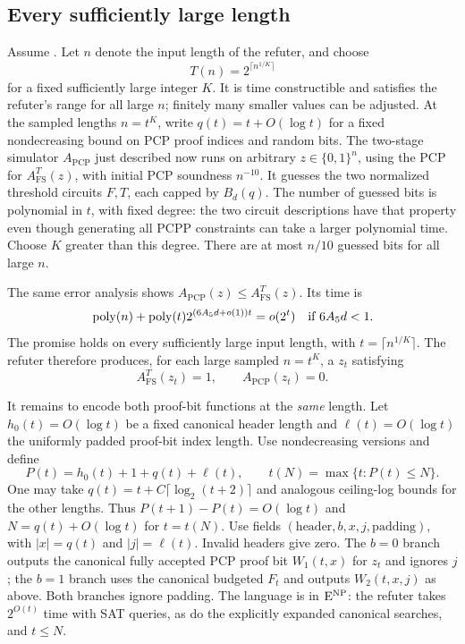 \subsection{Every sufficiently large length}
\label{subsec:ae}

Assume \HTC. Let $n$ denote the input length of the refuter, and
choose
\[
 T(n)=2^{\lceil n^{1/K}\rceil}
\]
for a fixed sufficiently large integer $K$. It is time constructible
and satisfies the refuter's range for all large $n$; finitely many
smaller values can be adjusted. At the sampled lengths $n=t^K$,
write $q(t)=t+O(\log t)$ for a fixed nondecreasing bound on PCP proof
indices and random bits. The two-stage simulator $A_{\mathrm{PCP}}$
just described now runs on arbitrary $z\in\{0,1\}^n$, using the PCP
for $A^T_{\mathrm{FS}}(z)$, with initial PCP soundness $n^{-10}$.
It guesses the two normalized threshold circuits $F,T$, each capped
by $B_d(q)$. The number of guessed bits is polynomial in $t$, with
fixed degree: the two circuit descriptions have that property even
though generating all PCPP constraints can take a larger polynomial
time. Choose $K$ greater than this degree. There are at most $n/10$
guessed bits for all large $n$.

The same error analysis shows
$A_{\mathrm{PCP}}(z)\le A^T_{\mathrm{FS}}(z)$. Its time is
\[
 \operatorname{poly}(n)+\operatorname{poly}(t)2^{(6A_5d+o(1))t}=o(2^t)
 \quad\text{if }6A_5d<1.
\]
The promise holds on every sufficiently large input length, with
$t=\lceil n^{1/K}\rceil$. The refuter therefore produces, for each
large sampled $n=t^K$, a $z_t$ satisfying
\begin{equation}\label{eq:refuter-gap}
 A^T_{\mathrm{FS}}(z_t)=1,
 \qquad A_{\mathrm{PCP}}(z_t)=0.
\end{equation}

It remains to encode both proof-bit functions at the \emph{same}
length. Let $h_0(t)=O(\log t)$ be a fixed canonical header length
and $\ell(t)=O(\log t)$ the uniformly padded proof-bit index length.
Use nondecreasing versions and define
\begin{equation}\label{eq:ae-padding}
 P(t)=h_0(t)+1+q(t)+\ell(t),\qquad
 t(N)=\max\{t:P(t)\le N\}.
\end{equation}
One may take $q(t)=t+C\lceil\log_2(t+2)\rceil$ and analogous
ceiling-log bounds for the other lengths. Thus $P(t+1)-P(t)=O(\log t)$
and $N=q(t)+O(\log t)$ for $t=t(N)$. Use fields
$(\text{header},b,x,j,\text{padding})$, with $|x|=q(t)$ and
$|j|=\ell(t)$. Invalid headers give zero. The $b=0$ branch outputs
the canonical fully accepted PCP proof bit $W_1(t,x)$ for $z_t$ and
ignores $j$; the $b=1$ branch uses the canonical budgeted $F_t$ and
outputs $W_2(t,x,j)$ as above. Both branches ignore padding.
The language is in $\mathrm{E}^{\mathrm{NP}}$: the refuter takes $2^{O(t)}$ time with
SAT queries, as do the explicitly expanded canonical searches, and
$t\le N$.

